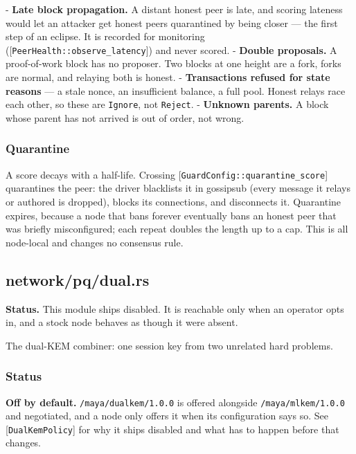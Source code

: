 \documentclass[11pt,a4paper]{article}
\begin{document}
- \textbf{Late block propagation.} A distant honest peer is late, and scoring
  lateness would let an attacker get honest peers quarantined by being
  closer — the first step of an eclipse. It is recorded for monitoring
  ([\texttt{PeerHealth::observe\_latency}]) and never scored.
- \textbf{Double proposals.} A proof-of-work block has no proposer. Two blocks at
  one height are a fork, forks are normal, and relaying both is honest.
- \textbf{Transactions refused for state reasons} — a stale nonce, an
  insufficient balance, a full pool. Honest relays race each other, so these
  are \texttt{Ignore}, not \texttt{Reject}.
- \textbf{Unknown parents.} A block whose parent has not arrived is out of order,
  not wrong.

\subsubsection{Quarantine}

A score decays with a half-life. Crossing [\texttt{GuardConfig::quarantine\_score}]
quarantines the peer: the driver blacklists it in gossipsub (every message
it relays or authored is dropped), blocks its connections, and disconnects
it. Quarantine expires, because a node that bans forever eventually bans an
honest peer that was briefly misconfigured; each repeat doubles the length
up to a cap. This is all node-local and changes no consensus rule.

\subsection{network/pq/dual.rs}
\begin{framed}\noindent\textbf{Status.} This module ships disabled. It is reachable only when an operator opts in, and a stock node behaves as though it were absent.\end{framed}

The dual-KEM combiner: one session key from two unrelated hard problems.

\subsubsection{Status}

\textbf{Off by default.} \texttt{/maya/dualkem/1.0.0} is offered alongside
\texttt{/maya/mlkem/1.0.0} and negotiated, and a node only offers it when its
configuration says so. See [\texttt{DualKemPolicy}] for why it ships disabled and
what has to happen before that changes.
\end{document}
